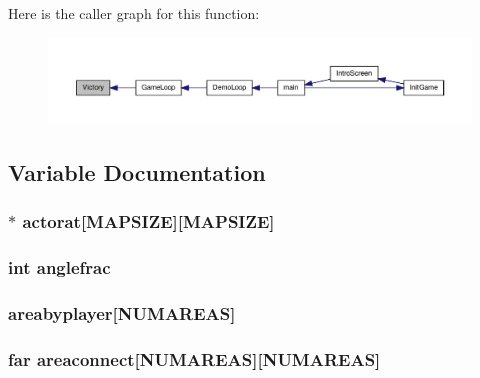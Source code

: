 Here is the caller graph for this function:
\nopagebreak
\begin{figure}[H]
\begin{center}
\leavevmode
\includegraphics[width=400pt]{WL__DEF_8H_aaa41fd21f2b55e23622375ac43624b99_icgraph}
\end{center}
\end{figure}




\subsection{Variable Documentation}
\hypertarget{WL__DEF_8H_a8b6c7ec70ee351719afac0dd216445c7}{
\subsubsection[{actorat}]{$\ast$ {\bf actorat}\mbox{[}MAPSIZE\mbox{]}\mbox{[}MAPSIZE\mbox{]}}}
\label{WL__DEF_8H_a8b6c7ec70ee351719afac0dd216445c7}
\hypertarget{WL__DEF_8H_a1f69f7886d762367ccbc2596edaf00e9}{
\subsubsection[{anglefrac}]{\setlength{\rightskip}{0pt plus 5cm}int {\bf anglefrac}}}
\label{WL__DEF_8H_a1f69f7886d762367ccbc2596edaf00e9}
\hypertarget{WL__DEF_8H_a59682b519d59a900dd195516111d7cc4}{
\subsubsection[{areabyplayer}]{ {\bf areabyplayer}\mbox{[}NUMAREAS\mbox{]}}}
\label{WL__DEF_8H_a59682b519d59a900dd195516111d7cc4}
\hypertarget{WL__DEF_8H_a508c3e1ce5df30e83a5b0d8711d6422b}{
\subsubsection[{areaconnect}]{ far {\bf areaconnect}\mbox{[}NUMAREAS\mbox{]}\mbox{[}NUMAREAS\mbox{]}}}
